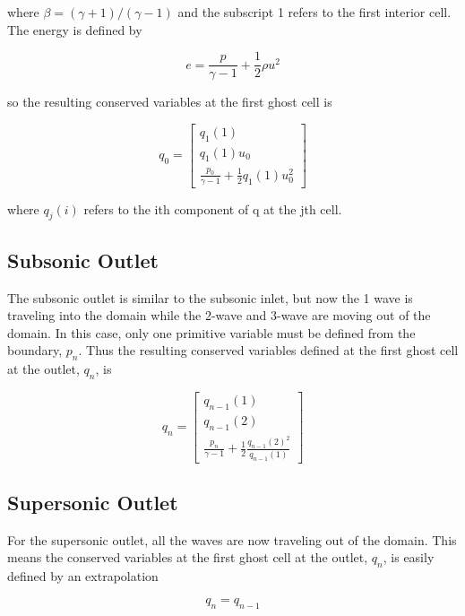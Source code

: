 \documentclass{article}%
\numberwithin{equation}{section}
\begin{document}
where $\beta = (\gamma + 1) / (\gamma  - 1)$ and the subscript 1 refers to the first interior cell. The energy is defined by 

\begin{equation}
e = \frac{p}{\gamma - 1} + \frac{1}{2} \rho u^2
\end{equation}

so the resulting conserved variables at the first ghost cell is 

\begin{equation}
q_0 =  \left[ \begin{array}{c} q_1(1) \\ q_1(1) u_0 \\ \frac{p_0}{\gamma - 1} + \frac{1}{2} q_1(1) u_0^2 \end{array} \right]
\end{equation}

where $q_j(i)$ refers to the ith component of q at the jth cell.

\subsection{Subsonic Outlet}
The subsonic outlet is similar to the subsonic inlet, but now the 1 wave is traveling into the domain while the 2-wave and 3-wave are moving out of the domain. In this case, only one primitive variable must be defined from the boundary, $p_n$. Thus the resulting conserved variables defined at the first ghost cell at the outlet, $q_n$, is

\begin{equation}
q_n =  \left[ \begin{array}{c} q_{n-1}(1) \\ q_{n-1}(2) \\ \frac{p_n}{\gamma - 1} + \frac{1}{2}\frac{q_{n-1}(2)^2}{q_{n-1}(1)} \end{array} \right]
\end{equation}

\subsection{Supersonic Outlet}
For the supersonic outlet, all the waves are now traveling out of the domain. This means the conserved variables at the first ghost cell at the outlet, $q_n$, is easily defined by an extrapolation 

\begin{equation}
q_n  =  q_{n-1}
\end{equation}
\end{document}
